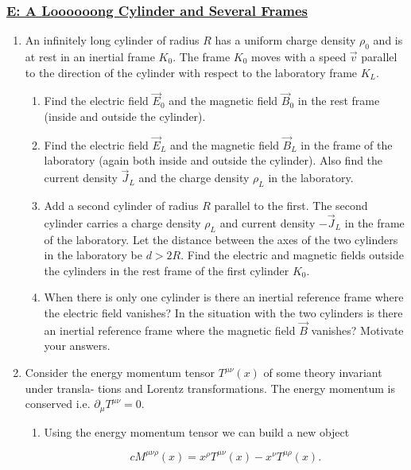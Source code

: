 \subsubsection{\hyperref[E: A Loooooong Cylinder and Several Frames]{E: A Loooooong Cylinder and Several Frames}}

\begin{enumerate}
	\item  An infinitely long cylinder of radius $R$ has a uniform charge density $\rho_{0}$ and is at rest in an inertial frame $K_{0}$. The frame $K_{0}$ moves with a speed $\vec{v}$ parallel to the direction of the cylinder with respect to the laboratory frame $K_{L}$.
	
	\begin{enumerate}
		\item  Find the electric field $\vec{E}_{0}$ and the magnetic field $\vec{B}_{0}$ in the rest frame (inside and
		outside the cylinder).
		\item  Find the electric field $\vec{E}_{L}$ and the magnetic field $\vec{B}_{L}$ in the frame of the laboratory (again both inside and outside the cylinder). Also find the current density $\vec{J}_{L}$ and
		the charge density $\rho_{L}$ in the laboratory.
		\item  Add a second cylinder of radius $R$ parallel to the first. The second cylinder carries a charge density $\rho_{L}$ and current density $-\vec{J}_{L}$ in the frame of the laboratory. Let the distance between the axes of the two cylinders in the laboratory be $d>2 R$. Find
		the electric and magnetic fields outside the cylinders in the rest frame of the first
		cylinder $K_{0}$.
		\item  When there is only one cylinder is there an inertial reference frame where the electric field vanishes? In the situation with the two cylinders is there an inertial reference frame where the magnetic field $\vec{B}$ vanishes? Motivate your answers.
	\end{enumerate}
	
	\item  Consider the energy momentum tensor $T^{\mu \nu}(x)$ of some theory invariant under transla-
	tions and Lorentz transformations. The energy momentum is conserved i.e. $\partial_{\mu} T^{\mu \nu}=0$.
	\begin{enumerate}
		\item Using the energy momentum tensor we can build a new object
		
		\begin{equation}
			cM^{\mu \nu \rho}(x)=x^{\rho} T^{\mu \nu}(x)-x^{\nu} T^{\mu \rho}(x).
		\end{equation}


\end{enumerate}
\end{enumerate}
